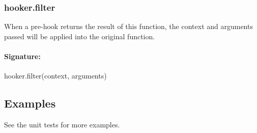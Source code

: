 \subsubsection*{hooker.\+filter}

When a pre-\/hook returns the result of this function, the context and arguments passed will be applied into the original function. \paragraph*{Signature\+:}

{\ttfamily hooker.\+filter(context, arguments)}

\subsection*{Examples}

See the unit tests for more examples.


